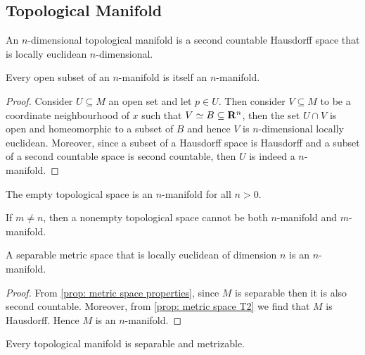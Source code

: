 \subsection{Topological Manifold}

\begin{definition}\label{def: topological manifold}
  An \(n\)-dimensional topological manifold is a second countable Hausdorff
  space that is locally euclidean \(n\)-dimensional.
\end{definition}

\begin{proposition}
  Every open subset of an \(n\)-manifold is itself an \(n\)-manifold.
\end{proposition}

\begin{proof}
  Consider \(U \subseteq M\) an open set and let \(p \in U\). Then consider \(V
  \subseteq M\) to be a coordinate neighbourhood of \(x\) such that \(V \simeq B
  \subseteq \mathbf{R}^n\), then the set \(U \cap V\) is open and homeomorphic
  to a subset of \(B\) and hence \(V\) is \(n\)-dimensional locally euclidean.
  Moreover, since a subset of a Hausdorff space is Hausdorff and a subset of a
  second countable space is second countable, then \(U\) is indeed a
  \(n\)-manifold.
\end{proof}

\begin{definition}
  The empty topological space is an \(n\)-manifold for all \(n > 0\).
\end{definition}

\begin{theorem}\label{def: manifold dimension invariance}
  If \(m \neq n\), then a nonempty topological space cannot be both
  \(n\)-manifold and \(m\)-manifold.
\end{theorem}

\begin{proposition}
  A separable metric space that is locally euclidean of dimension \(n\) is an
  \(n\)-manifold.
\end{proposition}

\begin{proof}
  From \cref{prop: metric space properties}, since \(M\) is separable then it is
  also second countable. Moreover, from \cref{prop: metric space T2} we find
  that \(M\) is Hausdorff. Hence \(M\) is an \(n\)-manifold.
\end{proof}

\begin{proposition}
  Every topological manifold is separable and metrizable.
\end{proposition}

